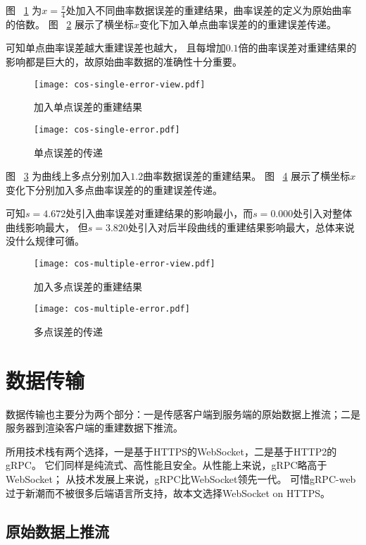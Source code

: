 图 ~\ref{fig:cos-single-error-view} 为$x = \frac{\pi}{4}$处加入不同曲率数据误差的重建结果，曲率误差的定义为原始曲率的倍数。
图 ~\ref{fig:cos-single-error} 展示了横坐标$x$变化下加入单点曲率误差的的重建误差传递。

可知单点曲率误差越大重建误差也越大，
且每增加$0.1$倍的曲率误差对重建结果的影响都是巨大的，故原始曲率数据的准确性十分重要。

\begin{figure}
\centering
\texttt{[image: cos-single-error-view.pdf]}
\caption{加入单点误差的重建结果}
\label{fig:cos-single-error-view}
\end{figure}

\begin{figure}
\centering
\texttt{[image: cos-single-error.pdf]}
\caption{单点误差的传递}
\label{fig:cos-single-error}
\end{figure}

图 ~\ref{fig:cos-multiple-error-view} 为曲线上多点分别加入$1.2$曲率数据误差的重建结果。
图 ~\ref{fig:cos-multiple-error} 展示了横坐标$x$变化下分别加入多点曲率误差的的重建误差传递。

可知$s=4.672$处引入曲率误差对重建结果的影响最小，而$s=0.000$处引入对整体曲线影响最大，
但$s=3.820$处引入对后半段曲线的重建结果影响最大，总体来说没什么规律可循。

\begin{figure}
\centering
\texttt{[image: cos-multiple-error-view.pdf]}
\caption{加入多点误差的重建结果}
\label{fig:cos-multiple-error-view}
\end{figure}

\begin{figure}
\centering
\texttt{[image: cos-multiple-error.pdf]}
\caption{多点误差的传递}
\label{fig:cos-multiple-error}
\end{figure}

\section{数据传输}

数据传输也主要分为两个部分：一是传感客户端到服务端的原始数据上推流；二是服务器到渲染客户端的重建数据下推流。

所用技术栈有两个选择，一是基于HTTPS的WebSocket，二是基于HTTP2的gRPC。
它们同样是纯流式、高性能且安全。从性能上来说，gRPC略高于WebSocket；
从技术发展上来说，gRPC比WebSocket领先一代。
可惜gRPC-web过于新潮而不被很多后端语言所支持，故本文选择WebSocket on HTTPS。

\subsection{原始数据上推流}

